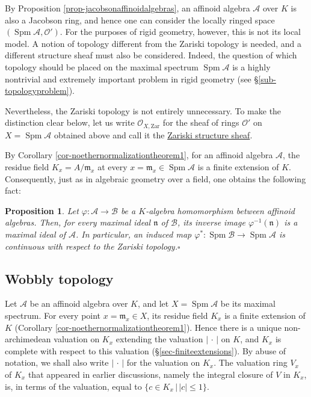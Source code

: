 \documentclass[a4paper,12pt, dvipdfmx]{jsbook}
\def\O{\mathscr{O}}
\def\m{\mathfrak{m}}
\def\Spm{\mathop{\mathrm{Spm}}\nolimits}
\def\Zar{\mathrm{Zar}}
\newcommand{\abs}[1]{\lvert#1\rvert}
\theoremstyle{plain}
\newtheorem{prop}[thm]{\bfseries Proposition}
\theoremstyle{definition}
\begin{document}
By Proposition \ref{prop-jacobsonaffinoidalgebras}, an affinoid algebra $\mathcal{A}$ over $K$ is also a Jacobson ring, and hence one can consider the locally ringed space $(\Spm\mathcal{A},\O')$.
For the purposes of rigid geometry, however, this is not its local model.
A notion of topology different from the Zariski topology is needed, and a different structure sheaf must also be considered.
Indeed, the question of which topology should be placed on the maximal spectrum $\Spm\mathcal{A}$ is a highly nontrivial and extremely important problem in rigid geometry (see \S\ref{sub-topologyproblem}).

Nevertheless, the Zariski topology is not entirely unnecessary. To make the distinction clear below, let us write $\O_{X,\Zar}$ for the sheaf of rings $\O'$ on $X=\Spm\mathcal{A}$ obtained above and call it the \underline{Zariski structure sheaf}.

By Corollary \ref{cor-noethernormalizationtheorem1}, for an affinoid algebra $\mathcal{A}$, the residue field $K_x=A/\m_x$ at every $x=\m_x\in\Spm\mathcal{A}$ is a finite extension of $K$.
Consequently, just as in algebraic geometry over a field, one obtains the following fact:
\begin{prop}\label{prop-spmfunctoriality}{\rm 
Let $\varphi\colon\mathcal{A}\rightarrow\mathcal{B}$ be a $K$-algebra homomorphism between affinoid algebras.
Then, for every maximal ideal $\mathfrak{n}$ of $\mathcal{B}$, its inverse image $\varphi^{-1}(\mathfrak{n})$ is a maximal ideal of $\mathcal{A}$.
In particular, an induced map $\varphi^{\ast}\colon\Spm\mathcal{B}\rightarrow\Spm\mathcal{A}$ is continuous with respect to the Zariski topology.}\hfill$\square$
\end{prop}

\subsection{Wobbly topology}\label{sub-wobblytopology}
Let $\mathcal{A}$ be an affinoid algebra over $K$, and let $X=\Spm\mathcal{A}$ be its maximal spectrum.
For every point $x=\m_x\in X$, its residue field $K_x$ is a finite extension of $K$ (Corollary \ref{cor-noethernormalizationtheorem1}).
Hence there is a unique non-archimedean valuation on $K_x$ extending the valuation $\abs{\,\cdot\,}$ on $K$, and $K_x$ is complete with respect to this valuation (\S\ref{sec-finiteextensions}).
By abuse of notation, we shall also write $\abs{\,\cdot\,}$ for the valuation on $K_x$.
The valuation ring $V_x$ of $K_x$ that appeared in earlier discussions, namely the integral closure of $V$ in $K_x$, is, in terms of the valuation, equal to $\{c\in K_x\,|\,\abs{c}\leq 1\}$.
\end{document}
